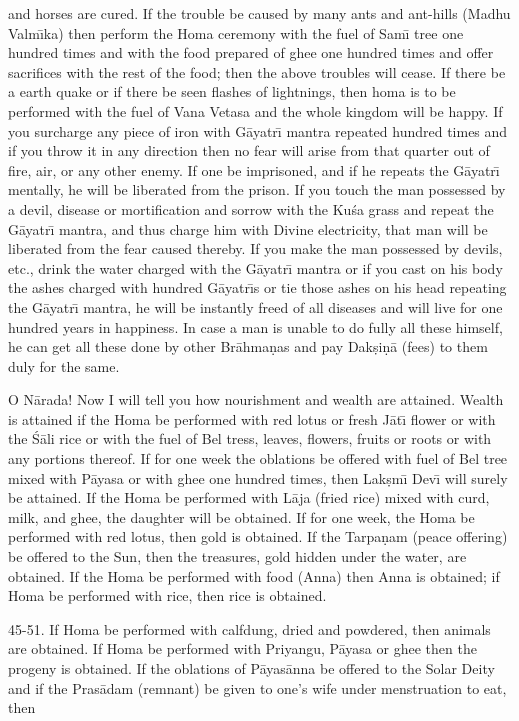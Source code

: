 and horses are cured. If the trouble be caused by many ants and ant-hills (Madhu Valm\={\i}ka) then perform the Homa ceremony with the fuel of Sam\={\i} tree one hundred times and with the food prepared of ghee one hundred times and offer sacrifices with the rest of the food; then the above troubles will cease. If there be a earth quake or if there be seen flashes of lightnings, then homa is to be performed with the fuel of Vana Vetasa and the whole kingdom will be happy. If you surcharge any piece of iron with G\=ayatr\={\i} mantra repeated hundred times and if you throw it in any direction then no fear will arise from that quarter out of fire, air, or any other enemy. If one be imprisoned, and if he repeats the G\=ayatr\={\i} mentally, he will be liberated from the prison. If you touch the man possessed by a devil, disease or mortification and sorrow with the Ku\'sa grass and repeat the G\=ayatr\={\i} mantra, and thus charge him with Divine electricity, that man will be liberated from the fear caused thereby. If you make the man possessed by devils, etc., drink the water charged with the G\=ayatr\={\i} mantra or if you cast on his body the ashes charged with hundred G\=ayatr\={\i}s or tie those ashes on his head repeating the G\=ayatr\={\i} mantra, he will be instantly freed of all diseases and will live for one hundred years in happiness. In case a man is unable to do fully all these himself, he can get all these done by other Br\=ahma\d{n}as and pay Dak\d{s}i\d{n}\=a (fees) to them duly for the same.

O N\=arada! Now I will tell you how nourishment and wealth are attained. Wealth is attained if the Homa be performed with red lotus or fresh J\=at\={\i} flower or with the \'S\=ali rice or with the fuel of Bel tress, leaves, flowers, fruits or roots or with any portions thereof. If for one week the oblations be offered with fuel of Bel tree mixed with P\=ayasa or with ghee one hundred times, then Lak\d{s}m\={\i} Dev\={\i} will surely be attained. If the Homa be performed with L\=aja (fried rice) mixed with curd, milk, and ghee, the daughter will be obtained. If for one week, the Homa be performed with red lotus, then gold is obtained. If the Tarpa\d{n}am (peace offering) be offered to the Sun, then the treasures, gold hidden under the water, are obtained. If the Homa be performed with food (Anna) then Anna is obtained; if Homa be performed with rice, then rice is obtained.

45-51. If Homa be performed with calfdung, dried and powdered, then animals are obtained. If Homa be performed with Priyangu, P\=ayasa or ghee then the progeny is obtained. If the oblations of P\=ayas\=anna be offered to the Solar Deity and if the Pras\=adam (remnant) be given to one's wife under menstruation to eat, then

